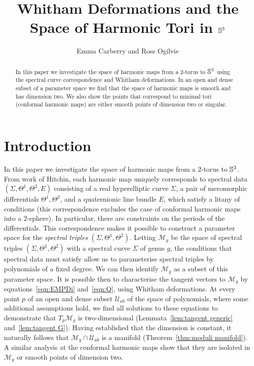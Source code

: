 \documentclass{article}
\begin{document}
\title{Whitham Deformations and the Space of Harmonic Tori in $\S^3$}
\author{Emma Carberry and Ross Ogilvie}
\date{}
\maketitle

\begin{abstract}
In this paper we investigate the space of harmonic maps from a 2-torus to $\S^3$ using the spectral curve correspondence and Whitham deformations. In an open and dense subset of a parameter space we find that the space of harmonic maps is smooth and has dimension two. We also show the points that correspond to minimal tori (conformal harmonic maps) are either smooth points of dimension two or singular.
\end{abstract}

\section{Introduction}
In this paper we investigate the space of harmonic maps from a 2-torus to $\S^3$. From work of Hitchin\cite{Hitchin1990}, each harmonic map uniquely corresponds to spectral data $(\Sigma,\Theta^1,\Theta^2,E)$ consisting of a real hyperelliptic curve $\Sigma$, a pair of meromorphic differentials $\Theta^1, \Theta^2$, and a quaternionic line bundle $E$, which satisfy a litany of conditions (this correspondence excludes the case of conformal harmonic maps into a 2-sphere). In particular, there are constraints on the periods of the differentials. This correspondence makes it possible to construct a parameter space for the \emph{spectral triples} $(\Sigma, \Theta^1, \Theta^2)$.  Letting $\mathcal{M}_g$ be the space of spectral triples $(\Sigma,\Theta^1,\Theta^2)$ with a spectral curve $\Sigma$ of genus $g$,
the conditions that spectral data must satisfy allow us to parameterise spectral triples by polynomials of a fixed degree. We can then identify $\mathcal{M}_g$ as a subset of this parameter space. It is possible then to characterise the tangent vectors to $\mathcal{M}_g$ by equations~\eqref{eqn:EMPDi} and~\eqref{eqn:Q}, using Whitham deformations. At every point $p$ of an open and dense subset $\mathcal{U}_{ab}$ of the space of polynomials, where some additional assumptions hold, we find all solutions to these equations to demonstrate that $T_p\mathcal{M}_g$ is two-dimensional (Lemmata~\ref{lem:tangent generic} and~\ref{lem:tangent G}). Having established that the dimension is constant, it naturally follows that $\mathcal{M}_g\cap \mathcal{U}_{ab}$ is a manifold (Theorem~\ref{thm:moduli manifold}). A similar analysis at the conformal harmonic maps show that they are isolated in $\mathcal{M}_g$ or smooth points of dimension two.
\end{document}
